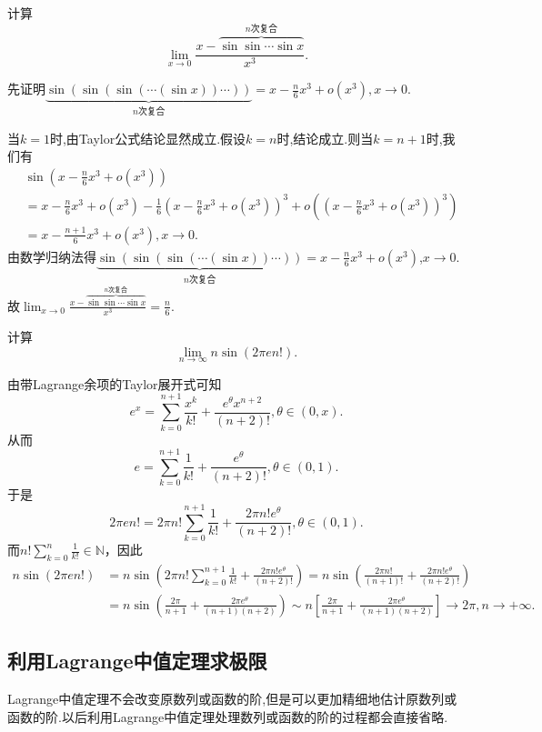 \documentclass[../../main.tex]{subfiles}
\begin{document}
\begin{example}
计算
\[
\lim_{x\rightarrow 0} \frac{x-\overset{n\text{次复合}}{\overbrace{\sin\sin \cdots \sin x}}}{x^3}.
\]
\end{example}
\begin{solution}
先证明\(\underbrace{\sin(\sin(\sin(\cdots (\sin x))\cdots))}_{n\text{次复合}} = x - \frac{n}{6}x^3 + o(x^3),x\to0\).

当\(k = 1\)时,由Taylor公式结论显然成立.假设\(k=n\)时,结论成立.则当\(k=n + 1\)时,我们有
\begin{align*}
&\sin\left(x - \frac{n}{6}x^3 + o(x^3)\right)
\\
&= x - \frac{n}{6}x^3 + o(x^3) - \frac{1}{6}\left(x - \frac{n}{6}x^3 + o(x^3)\right)^3 + o\left(\left(x - \frac{n}{6}x^3 + o(x^3)\right)^3\right)
\\
&= x - \frac{n + 1}{6}x^3 + o(x^3),x\to0.
\end{align*}
由数学归纳法得\(\underbrace{\sin(\sin(\sin(\cdots (\sin x))\cdots))}_{n\text{次复合}} = x - \frac{n}{6}x^3 + o(x^3)\),$x\to0$.
故$\lim_{x\rightarrow 0} \frac{x-\overset{n\text{次复合}}{\overbrace{\sin\sin \cdots \sin x}}}{x^3}=\frac{n}{6}.$
\end{solution}


\begin{example}
计算
\[
\lim_{n\rightarrow \infty}n\sin(2\pi en!).
\]
\end{example}
\begin{solution}
由带Lagrange余项的Taylor展开式可知
\[
e^x = \sum_{k = 0}^{n + 1}\frac{x^k}{k!} + \frac{e^{\theta}x^{n + 2}}{(n + 2)!}, \theta \in (0, x).
\]
从而
\[
e = \sum_{k = 0}^{n + 1}\frac{1}{k!} + \frac{e^{\theta}}{(n + 2)!}, \theta \in (0, 1).
\]
于是
\[
2\pi en! = 2\pi n!\sum_{k = 0}^{n + 1}\frac{1}{k!} + \frac{2\pi n!e^{\theta}}{(n + 2)!}, \theta \in (0, 1).
\]
而\(n!\sum_{k = 0}^n\frac{1}{k!} \in \mathbb{N}\)，因此
\begin{align*}
n\sin(2\pi en!)&=n\sin\left(2\pi n!\sum_{k = 0}^{n + 1}\frac{1}{k!} + \frac{2\pi n!e^{\theta}}{(n + 2)!}\right)
=n\sin\left(\frac{2\pi n!}{(n + 1)!} + \frac{2\pi n!e^{\theta}}{(n + 2)!}\right)\\
&=n\sin\left(\frac{2\pi}{n + 1} + \frac{2\pi e^{\theta}}{(n + 1)(n + 2)}\right)
\sim n\left[\frac{2\pi}{n + 1} + \frac{2\pi e^{\theta}}{(n + 1)(n + 2)}\right] \to 2\pi, n \to +\infty.
\end{align*} 
\end{solution}


\subsection{利用Lagrange中值定理求极限}
Lagrange中值定理不会改变原数列或函数的阶,但是可以更加精细地估计原数列或函数的阶.以后利用Lagrange中值定理处理数列或函数的阶的过程都会直接省略.
\end{document}

